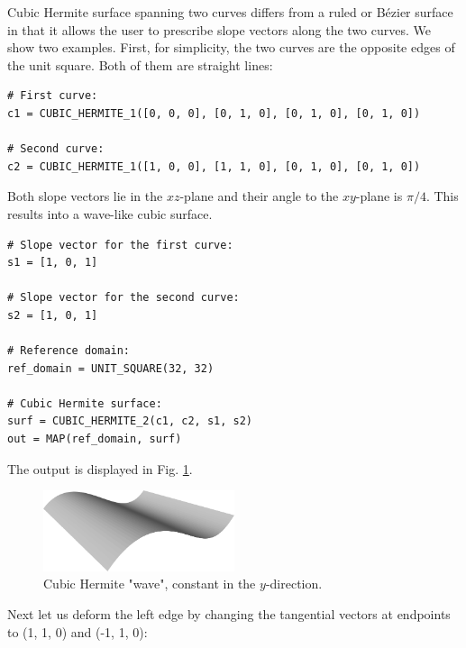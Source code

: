 Cubic Hermite surface 
spanning two curves differs from a ruled or B\'ezier surface in that 
it allows the user to prescribe slope vectors along the 
two curves. We show two examples. First, for simplicity,
the two curves are the opposite edges of the unit square. 
Both of them are straight lines:\\

\begin{bbox}
\begin{verbatim}
# First curve:
c1 = CUBIC_HERMITE_1([0, 0, 0], [0, 1, 0], [0, 1, 0], [0, 1, 0])

# Second curve:
c2 = CUBIC_HERMITE_1([1, 0, 0], [1, 1, 0], [0, 1, 0], [0, 1, 0])
\end{verbatim}
\end{bbox}
\vspace{6mm}

\noindent
Both slope vectors lie in the $xz$-plane and their angle to the $xy$-plane
is $\pi/4$. This results into a wave-like cubic surface.\\

\begin{bbox}
\begin{verbatim}
# Slope vector for the first curve:
s1 = [1, 0, 1]

# Slope vector for the second curve:
s2 = [1, 0, 1]

# Reference domain:
ref_domain = UNIT_SQUARE(32, 32)

# Cubic Hermite surface:
surf = CUBIC_HERMITE_2(c1, c2, s1, s2)
out = MAP(ref_domain, surf)
\end{verbatim}
\end{bbox}
\vspace{6mm}

\noindent
The output is displayed in Fig. \ref{fig:curves-14b}.

\begin{figure}[!ht]
\begin{center}
\includegraphics[width=0.5\textwidth]{img/curves-14b.png}
\end{center}
\vspace{-6mm}
\caption{Cubic Hermite "wave", constant in the $y$-direction.}
\label{fig:curves-14b}
\end{figure}
\noindent
Next let us deform the left edge by changing the tangential 
vectors at endpoints to (1, 1, 0) and (-1, 1, 0):\\

